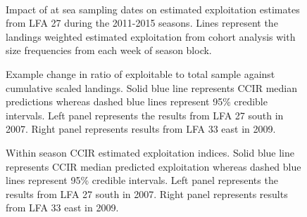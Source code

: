 \documentclass[11pt]{article}
\newcommand{\D}{.}
\newcommand{\e}{/backup/bio_data/bio.lobster/figures/} %
\begin{document}
\begin{landscape}
\begin{figure}
        \centering
         \\
                     \caption{Impact of at sea sampling dates on estimated exploitation estimates from LFA 27 during the 2011-2015 seasons. Lines represent the landings weighted estimated exploitation from cohort analysis with size frequencies from each week of season block.}
        \end{figure}


\begin{figure}
\centering
              \caption{Example change in ratio of exploitable to total sample against cumulative scaled landings. Solid blue line represents CCIR median predictions whereas dashed blue lines represent 95\% credible intervals. Left panel represents the results from LFA 27 south in 2007. Right panel represents results from LFA 33 east in 2009.}
\end{figure}


\begin{figure}
\centering
             \caption{Within season CCIR estimated exploitation indices. Solid blue line represents CCIR median predicted exploitation whereas dashed blue lines represent 95\% credible intervals. Left panel represents the results from LFA 27 south in 2007. Right panel represents results from LFA 33 east in 2009.}
\end{figure}


\end{landscape}
\end{document}
